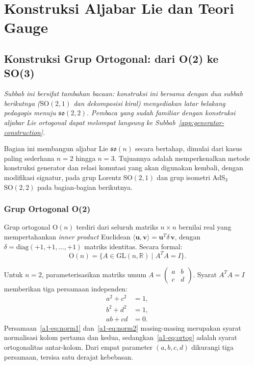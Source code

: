 \chapter{Konstruksi Aljabar Lie dan Teori Gauge}

\section{Konstruksi Grup Ortogonal: dari O(2) ke SO(3)}
\label{app:O2-SO3}

\noindent\textit{Subbab ini bersifat tambahan bacaan: konstruksi ini bersama dengan dua subbab berikutnya ($\mathrm{SO}(2,1)$ dan dekomposisi kiral) menyediakan latar belakang pedagogis menuju $\mathfrak{so}(2,2)$. Pembaca yang sudah familiar dengan konstruksi aljabar Lie ortogonal dapat melompat langsung ke Subbab~\ref{app:generator-construction}.}

Bagian ini membangun aljabar Lie $\mathfrak{so}(n)$ secara bertahap, dimulai dari kasus paling sederhana $n = 2$ hingga $n = 3$. Tujuannya adalah memperkenalkan metode konstruksi generator dan relasi komutasi yang akan digunakan kembali, dengan modifikasi signatur, pada grup Lorentz $\mathrm{SO}(2,1)$ dan grup isometri AdS$_3$ $\mathrm{SO}(2,2)$ pada bagian-bagian berikutnya.

\subsection{Grup Ortogonal O(2)}

Grup ortogonal $\mathrm{O}(n)$ terdiri dari seluruh matriks $n \times n$ bernilai real yang mempertahankan \emph{inner product} Euclidean $\langle\mathbf{u},\mathbf{v}\rangle = \mathbf{u}^T \delta\,\mathbf{v}$, dengan $\delta = \mathrm{diag}(+1,+1,\ldots,+1)$ matriks identitas. Secara formal:
\begin{equation}\label{a1-eq:On-def}
    \mathrm{O}(n) = \{A \in \mathrm{GL}(n,\mathbb{R}) \mid A^T A = I\}.
\end{equation}

Untuk $n = 2$, parameterisasikan matriks umum $A = \begin{pmatrix}a & b \\ c & d\end{pmatrix}$. Syarat $A^T A = I$ memberikan tiga persamaan independen:
\begin{align}
    a^2 + c^2 &= 1, \label{a1-eq:norm1}\\
    b^2 + d^2 &= 1, \label{a1-eq:norm2}\\
    ab + cd &= 0. \label{a1-eq:ortog}
\end{align}
Persamaan~\eqref{a1-eq:norm1} dan~\eqref{a1-eq:norm2} masing-masing merupakan syarat normalisasi kolom pertama dan kedua, sedangkan~\eqref{a1-eq:ortog} adalah syarat ortogonalitas antar-kolom. Dari empat parameter $(a,b,c,d)$ dikurangi tiga persamaan, tersisa satu derajat kebebasan.

